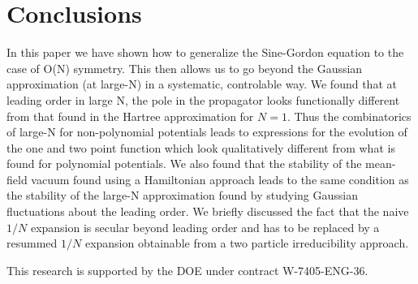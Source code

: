 \documentclass[a4paper,prd,preprint,superscriptaddress,showpacs,byrevtex]{revtex4}
\begin{document}
\section{Conclusions}
In this paper we have shown how to generalize the Sine-Gordon equation to the case of
O(N) symmetry.  This then allows  us to go beyond the Gaussian
approximation (at large-N) in a systematic, controlable way.  We found that at
leading order in large N, the pole in the propagator looks functionally
different from that found in the Hartree approximation for $N=1$. Thus the
combinatorics of large-N for non-polynomial potentials leads to expressions for
the evolution of the one and two point function which look qualitatively
different from what is found for polynomial potentials. We also found that the
stability of the mean-field vacuum found using a Hamiltonian approach leads to
the same condition as the stability of the large-N approximation found by
studying Gaussian fluctuations about the leading order. We briefly
discussed the fact that the naive $1/N$ expansion is secular beyond leading
order and has to be replaced by a resummed $1/N$ expansion obtainable from a
two particle irreducibility approach. 

\acknowledgments This research is supported by the DOE under contract
W-7405-ENG-36.
\end{document}

